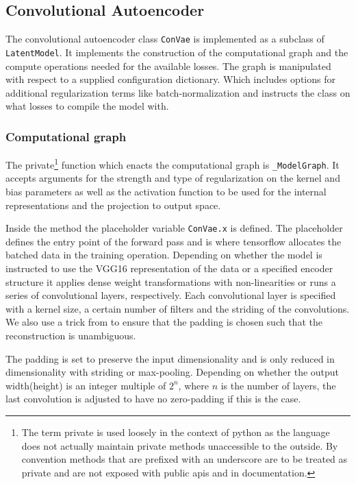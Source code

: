 
\subsection{Convolutional Autoencoder}\label{sec:convae_implement}

The convolutional autoencoder class \lstinline{ConVae} is implemented as a subclass of \lstinline{LatentModel}. It implements the construction of the computational graph and the compute operations needed for the available losses. The graph is manipulated with respect to a supplied configuration dictionary. Which includes options for additional regularization terms like batch-normalization and instructs the class on what losses to compile the model with. 

\subsubsection{Computational graph}

The private\footnote{The term private is used loosely in the context of python as the language does not actually maintain private methods unaccessible to the outside. By convention methods that are prefixed with an underscore are to be treated as private and are not exposed with public apis and in documentation.} function which enacts the computational graph is \lstinline{_ModelGraph}. It accepts arguments for the strength and type of regularization on the kernel and bias parameters as well as the activation function to be used for the internal representations and the projection to output space. 

Inside the method the placeholder variable \lstinline{ConVae.x} is defined. The placeholder defines the entry point of the forward pass and is where tensorflow allocates the batched data in the training operation. Depending on whether the model is instructed to use the VGG16 representation of the data or a specified encoder structure it applies dense weight transformations with non-linearities or runs a series of convolutional layers, respectively. Each convolutional layer is specified with a kernel size, a certain number of filters and the striding of the convolutions. We also use a trick from \citet{Guo2017} to ensure that the padding is chosen such that the reconstruction is unambiguous. 

The padding is set to preserve the input dimensionality and is only reduced in dimensionality with striding or max-pooling. Depending on whether the output width(height) is an integer multiple of $2^n$, where $n$ is the number of layers, the last convolution is adjusted to have no zero-padding if this is the case. 

